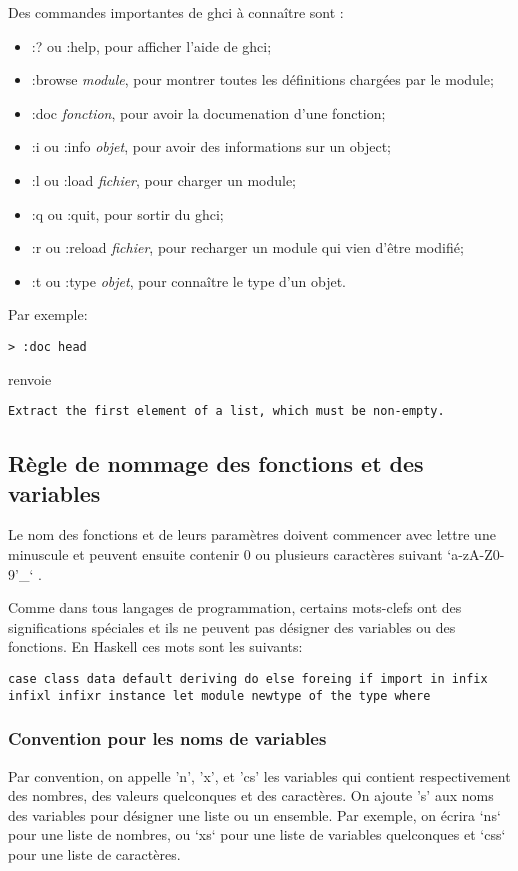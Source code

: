 \documentclass[11pt]{article}
\begin{document}
Des commandes importantes de ghci à connaître sont :
\begin{itemize}
\item :? ou :help,  pour afficher l'aide de ghci;
\item :browse \emph{module},  pour montrer toutes les définitions chargées par le module;
\item :doc \emph{fonction},  pour avoir la documenation d'une fonction;
\item :i ou :info \emph{objet}, pour avoir des informations sur un object;
\item :l ou :load \emph{fichier}, pour charger un module;
\item :q ou :quit,  pour sortir du ghci;
\item :r ou :reload \emph{fichier},  pour recharger un module qui vien d'être modifié;
\item :t ou :type \emph{objet},  pour connaître le type d'un objet.
\end{itemize}

Par exemple:
\begin{verbatim}
> :doc head
\end{verbatim}
renvoie
\begin{verbatim}
Extract the first element of a list, which must be non-empty.
\end{verbatim}

\subsection{Règle de nommage des fonctions et des variables}
\label{sec:org9e1b0ff}

Le nom des fonctions et de leurs paramètres doivent commencer avec lettre une minuscule et peuvent ensuite contenir 0 ou plusieurs caractères suivant `a-zA-Z0-9'\_` .

Comme dans tous langages de programmation, certains mots-clefs ont des significations spéciales et ils ne peuvent pas désigner des variables ou des fonctions. En Haskell ces mots sont les suivants:

\begin{verbatim}
case class data default deriving do else foreing if import in infix infixl infixr instance let module newtype of the type where
\end{verbatim}

\subsubsection{Convention pour les noms de variables}
\label{sec:org6df80a2}
Par convention, on appelle 'n', 'x', et 'cs' les variables qui contient respectivement des nombres, des valeurs quelconques et des caractères.
On ajoute 's' aux noms des variables pour désigner une liste ou un ensemble.  Par exemple,  on écrira `ns`  pour une liste de nombres, ou `xs`  pour une liste de variables quelconques et `css`  pour une liste de caractères.
\end{document}
